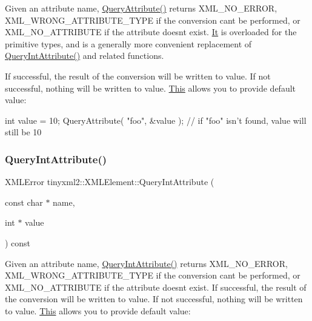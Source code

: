 Given an attribute name, \hyperlink{classtinyxml2_1_1_x_m_l_element_a042fc30504347b84a56cf863ad528a4f}{Query\+Attribute()} returns X\+M\+L\+\_\+\+N\+O\+\_\+\+E\+R\+R\+OR, X\+M\+L\+\_\+\+W\+R\+O\+N\+G\+\_\+\+A\+T\+T\+R\+I\+B\+U\+T\+E\+\_\+\+T\+Y\+PE if the conversion can\textquotesingle{}t be performed, or X\+M\+L\+\_\+\+N\+O\+\_\+\+A\+T\+T\+R\+I\+B\+U\+TE if the attribute doesn\textquotesingle{}t exist. \hyperlink{class_it}{It} is overloaded for the primitive types, and is a generally more convenient replacement of \hyperlink{classtinyxml2_1_1_x_m_l_element_a8a78bc1187c1c45ad89f2690eab567b1}{Query\+Int\+Attribute()} and related functions.

If successful, the result of the conversion will be written to \textquotesingle{}value\textquotesingle{}. If not successful, nothing will be written to \textquotesingle{}value\textquotesingle{}. \hyperlink{namespace_this}{This} allows you to provide default value\+:

\begin{DoxyVerb}int value = 10;
QueryAttribute( "foo", &value );        // if "foo" isn't found, value will still be 10
\end{DoxyVerb}
 \mbox{\label{classtinyxml2_1_1_x_m_l_element_a8a78bc1187c1c45ad89f2690eab567b1}} 
\subsubsection{\texorpdfstring{Query\+Int\+Attribute()}{QueryIntAttribute()}}
{\footnotesize\ttfamily X\+M\+L\+Error tinyxml2\+::\+X\+M\+L\+Element\+::\+Query\+Int\+Attribute (\begin{DoxyParamCaption}\item[{const char $\ast$}]{name,  }\item[{int $\ast$}]{value }\end{DoxyParamCaption}) const\hspace{0.3cm}{\ttfamily [inline]}}

Given an attribute name, \hyperlink{classtinyxml2_1_1_x_m_l_element_a8a78bc1187c1c45ad89f2690eab567b1}{Query\+Int\+Attribute()} returns X\+M\+L\+\_\+\+N\+O\+\_\+\+E\+R\+R\+OR, X\+M\+L\+\_\+\+W\+R\+O\+N\+G\+\_\+\+A\+T\+T\+R\+I\+B\+U\+T\+E\+\_\+\+T\+Y\+PE if the conversion can\textquotesingle{}t be performed, or X\+M\+L\+\_\+\+N\+O\+\_\+\+A\+T\+T\+R\+I\+B\+U\+TE if the attribute doesn\textquotesingle{}t exist. If successful, the result of the conversion will be written to \textquotesingle{}value\textquotesingle{}. If not successful, nothing will be written to \textquotesingle{}value\textquotesingle{}. \hyperlink{namespace_this}{This} allows you to provide default value\+:

